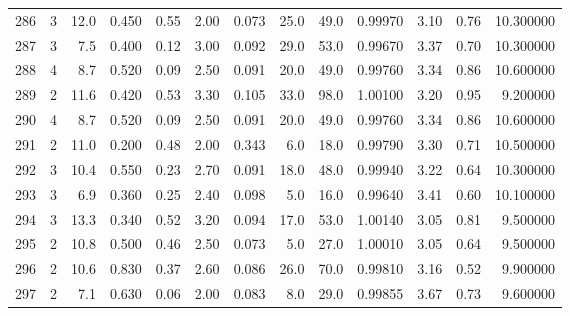 \begin{tabular}{lrrrrrrrrrrrr}
286  &        3 &           12.0 &             0.450 &         0.55 &            2.00 &      0.073 &                 25.0 &                  49.0 &  0.99970 &  3.10 &       0.76 &  10.300000 \\
287  &        3 &            7.5 &             0.400 &         0.12 &            3.00 &      0.092 &                 29.0 &                  53.0 &  0.99670 &  3.37 &       0.70 &  10.300000 \\
288  &        4 &            8.7 &             0.520 &         0.09 &            2.50 &      0.091 &                 20.0 &                  49.0 &  0.99760 &  3.34 &       0.86 &  10.600000 \\
289  &        2 &           11.6 &             0.420 &         0.53 &            3.30 &      0.105 &                 33.0 &                  98.0 &  1.00100 &  3.20 &       0.95 &   9.200000 \\
290  &        4 &            8.7 &             0.520 &         0.09 &            2.50 &      0.091 &                 20.0 &                  49.0 &  0.99760 &  3.34 &       0.86 &  10.600000 \\
291  &        2 &           11.0 &             0.200 &         0.48 &            2.00 &      0.343 &                  6.0 &                  18.0 &  0.99790 &  3.30 &       0.71 &  10.500000 \\
292  &        3 &           10.4 &             0.550 &         0.23 &            2.70 &      0.091 &                 18.0 &                  48.0 &  0.99940 &  3.22 &       0.64 &  10.300000 \\
293  &        3 &            6.9 &             0.360 &         0.25 &            2.40 &      0.098 &                  5.0 &                  16.0 &  0.99640 &  3.41 &       0.60 &  10.100000 \\
294  &        3 &           13.3 &             0.340 &         0.52 &            3.20 &      0.094 &                 17.0 &                  53.0 &  1.00140 &  3.05 &       0.81 &   9.500000 \\
295  &        2 &           10.8 &             0.500 &         0.46 &            2.50 &      0.073 &                  5.0 &                  27.0 &  1.00010 &  3.05 &       0.64 &   9.500000 \\
296  &        2 &           10.6 &             0.830 &         0.37 &            2.60 &      0.086 &                 26.0 &                  70.0 &  0.99810 &  3.16 &       0.52 &   9.900000 \\
297  &        2 &            7.1 &             0.630 &         0.06 &            2.00 &      0.083 &                  8.0 &                  29.0 &  0.99855 &  3.67 &       0.73 &   9.600000 \\

\end{tabular}

